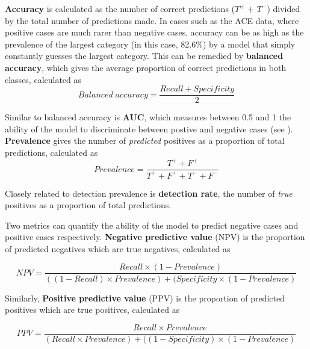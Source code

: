 \textbf{Accuracy} is calculated as the number of correct predictions ($T^+$ + $T^-$) divided by the total number of predictions made. In cases such as the ACE data, where positive cases are much rarer than negative cases, accuracy can be as high as the prevalence of the largest category (in this case, 82.6\%) by a model that simply constantly guesses the largest category.
This can be remedied by\textbf{ balanced accuracy}, which gives the average proportion of correct predictions in both classes, calculated as
\begin{equation}
Balanced\;accuracy = \frac{Recall + Specificity}{2}\label{eq:balanced-accuracy}
\end{equation}

Similar to balanced accuracy is \textbf{AUC}, which measures between 0.5 and 1 the ability of the model to discriminate between postive and negative cases (see ). 
\textbf{Prevalence} gives the number of \textit{predicted} positives as a proportion of total predictions, calculated as
\begin{equation}
Prevalence = \frac{T^+ + F^+}
{T^+ + F^+ + T^- + F^-}
\end{equation}

Closely related to detection prevalence is \textbf{detection rate}, the number of \textit{true} positives as a proportion of total predictions.



Two metrics can quantify the ability of the model to predict negative cases and positive cases respectively. \textbf{Negative predictive value} (NPV) is the proportion of predicted negatives which are true negatives, calculated as

\begin{equation}
NPV = \frac{Recall \times (1-Prevalence)}
{((1-Recall) \times Prevalence) + (Specificity \times (1-Prevalence)}
\end{equation}

Similarly, \textbf{Positive predictive value} (PPV) is the proportion of predicted positives which are true positives, calculated as

\begin{equation}
PPV = \frac{Recall \times Prevalence}
{(Recall \times Prevalence) + ((1-Specificity) \times (1-Prevalence)}
\end{equation}

